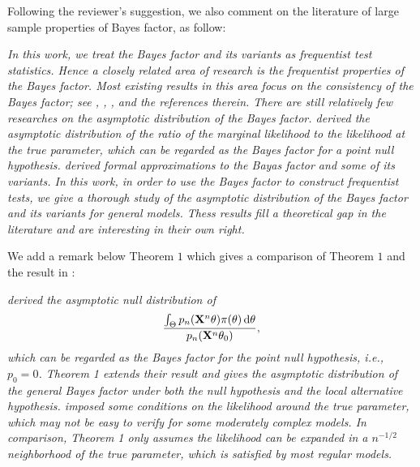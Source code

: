 \documentclass[11pt]{article}
\theoremstyle{plain}
\theoremstyle{definition}
\theoremstyle{remark}
\begin{document}
Following the reviewer's suggestion, we also comment on the literature of large sample properties of Bayes factor, as follow:
\begin{adjustwidth}{1.5em}{1.5em}
    \emph{
        In this work, we treat the Bayes factor and its variants as frequentist test statistics.
        Hence a closely related area of research is the frequentist properties of the Bayes factor.
        Most existing results in this area focus on the consistency of the Bayes factor; see \cite{berger2003approximations}, \cite{moreno2010},      \cite{WangMin2016}, \cite{Chatterjee2017} and the references therein.
        There are still relatively few researches on the asymptotic distribution of the Bayes factor.
        \cite{clarke1990information} derived the asymptotic distribution of the ratio of the marginal likelihood to the likelihood at the true parameter, which can be regarded as the Bayes factor for a point null hypothesis.
        \cite{Gelfand1994} derived formal approximations to the Bayas factor and some of its variants.
        In this work, in order to use the Bayes factor to construct frequentist tests, we give a thorough study of the asymptotic distribution of the Bayes factor and its variants for general models.
        Thess results fill a theoretical gap in the literature and are interesting in their own right.
}
\end{adjustwidth}

We add a remark below Theorem $1$ which gives a comparison of Theorem $1$ and the result in \cite{clarke1990information}:
\begin{adjustwidth}{1.5em}{1.5em}
    \emph{
            \cite{clarke1990information} 
            derived the asymptotic null distribution of 
            $$
            \frac{
                    {\int_{\Theta} p_n(\mathbf{X}^{n}\theta) \pi(\theta)\, \mathrm d\theta}
            }
            {p_n(\mathbf{X}^{n}\theta_0)}
            ,
            $$
            which can be regarded as the Bayes factor for the point null hypothesis, i.e., $p_0 = 0$.
            Theorem 1 extends their result and gives the asymptotic distribution of the general Bayes factor under both the null       hypothesis and the local alternative hypothesis.
            \cite{clarke1990information} imposed some conditions on the likelihood around the true parameter, which may not be easy to verify for some    moderately complex models.
            In comparison, Theorem 1 only assumes the likelihood can be expanded in a $n^{-1/2}$ neighborhood of the true parameter,   which is satisfied by most regular models.
}
\end{adjustwidth}
\end{document}
